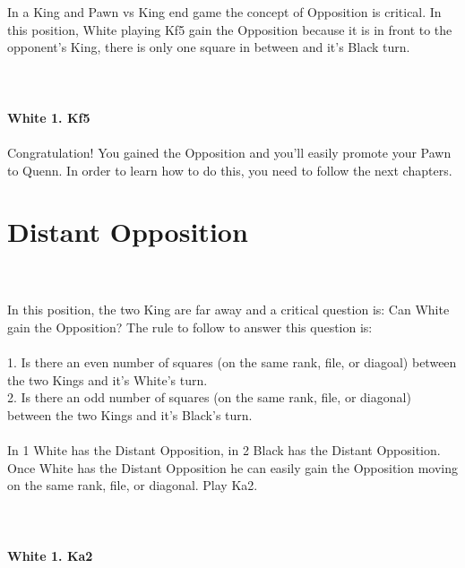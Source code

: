 \documentclass{article}
\begin{document}

\\
\\
In a King and Pawn vs King end game the concept of Opposition is critical. In this position, White playing Kf5 gain the Opposition because it is in front to the opponent's King, there is only one square in between and it's Black turn.\\
\\

\\
\\
\textbf{White 1. Kf5}\\
\\
Congratulation! You gained the Opposition and you'll easily promote your Pawn to Quenn. In order to learn how to do this, you need to follow the next chapters.\section{ Distant Opposition}

\\
\\
In this position, the two King are far away and a critical question is: Can White gain the Opposition? The rule to follow to answer this question is:\\\\1. Is there an even number of squares (on the same rank, file, or diagoal) between the two Kings and it's White's turn.\\2. Is there an odd number of squares (on the same rank, file, or diagonal) between the two Kings and it's Black's turn.\\\\In 1 White has the Distant Opposition, in 2 Black has the Distant Opposition. Once White has the Distant Opposition he can easily gain the Opposition moving on the same rank, file, or diagonal. Play Ka2.\\
\\

\\
\\
\textbf{White 1. Ka2}\\
\\
\\
\\

\end{document}
